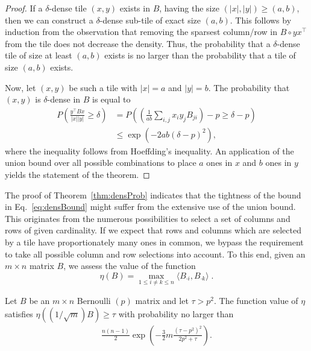 \begin{proof}
If a $\delta$-dense tile $(x,y)$ exists in $B$, having the size  $(|x|,|y|)\geq (a,b)$, then we can construct a $\delta$-dense sub-tile of exact size $(a,b)$. This follows by induction from the observation that removing the sparsest column/row in $B\circ yx^\top$ from the tile does not decrease the density. Thus, the probability that a $\delta$-dense tile of size at least $(a,b)$ exists is no larger than the probability that a tile of size $(a,b)$ exists.  

Now, let $(x,y)$ be such a tile with $|x|= a$ and $|y|= b$. The probability that $(x,y)$ is $\delta$-dense in $B$ is equal to
\begin{align*}
P\left(\frac{y^\top Bx}{|x||y|}\geq \delta\right)
&=P\left(\left(\frac{1}{ab}\sum_{i,j}x_iy_jB_{ji}\right)-p\geq \delta-p\right)\\
&\leq \exp(-2ab(\delta-p)^2),
\end{align*}
where the inequality follows from Hoeffding's inequality.
An application of the union bound over all possible combinations to place $a$ ones in $x$ and $b$ ones in $y$ yields the statement of the theorem.
\end{proof}
The proof of Theorem~\ref{thm:densProb} indicates that the tightness of the bound in Eq.~\eqref{eq:densBound} might suffer from the extensive use of the union bound. This originates from the numerous possibilities to select a set of columns and rows of given cardinality. If we expect that rows and columns which are selected by a tile have proportionately many ones in common, we bypass the requirement to take all possible column and row selections into account. To this end, given an $m\times n$ matrix $B$, we assess the value of the function 
\[
\eta(B)= \max_{1\leq i\neq k\leq n} \langle B_{\cdot i},B_{\cdot k}\rangle\;.
\] 
\begin{theorem}\label{thm:cohBound}
Let $B$ be an $m\times n$ Bernoulli $(p)$ matrix and let $\tau>p^2$. The function value of $\eta$ satisfies
$
\eta\left(({1}/\sqrt{m})B\right) \geq \tau
$
with probability no larger than
\begin{align}\label{eq:cohBound}  
\frac{n(n-1)}{2}\exp\left( -\frac{3}{2}m\frac{(\tau-p^2)^2}{2p^2+\tau}\right). 
\end{align}
\end{theorem}
%
